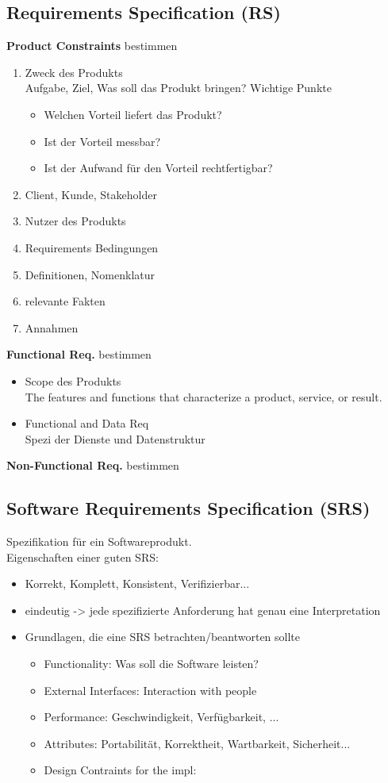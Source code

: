 \subsection{Requirements Specification (RS)}
\textbf{Product Constraints} bestimmen
\begin{enumerate}
	\item Zweck des Produkts\\
	Aufgabe, Ziel, Was soll das Produkt bringen? Wichtige Punkte
	\begin{itemize}
		\item Welchen Vorteil liefert das Produkt?
		\item Ist der Vorteil messbar?
		\item Ist der Aufwand für den Vorteil rechtfertigbar?
	\end{itemize}
	\item Client, Kunde, Stakeholder
	\item Nutzer des Produkts
	\item Requirements Bedingungen
	\item Definitionen, Nomenklatur
	\item relevante Fakten
	\item Annahmen
\end{enumerate}
\textbf{Functional Req.} bestimmen
\begin{itemize}
	\item Scope des Produkts\\
	The features and functions that characterize a product, service, or result.
	\item Functional and Data Req\\
	Spezi der Dienste und Datenstruktur
\end{itemize}
\textbf{Non-Functional Req.} bestimmen

\subsection{Software Requirements Specification (SRS)}
Spezifikation für ein Softwareprodukt.\\
Eigenschaften einer guten SRS:
\begin{itemize}
	\item Korrekt, Komplett, Konsistent, Verifizierbar...
	\item eindeutig -> jede spezifizierte Anforderung hat genau eine Interpretation
	\item Grundlagen, die eine SRS betrachten/beantworten sollte
	\begin{itemize}
		\item Functionality: Was soll die Software leisten?
		\item External Interfaces: Interaction with people
		\item Performance: Geschwindigkeit, Verfügbarkeit, ...
		\item Attributes: Portabilität, Korrektheit, Wartbarkeit, Sicherheit...
		\item Design Contraints for the impl:
	\end{itemize}
\end{itemize}

